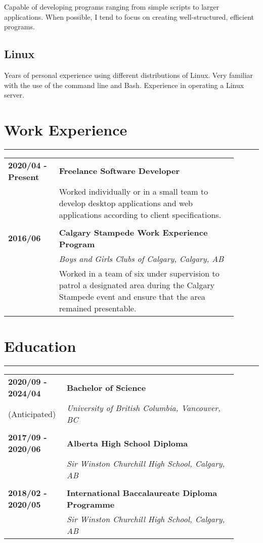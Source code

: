 \documentclass[letterpaper]{article}
\newcommand{\horizontalLine}{%
    \rule{\linewidth}{0.2pt}
    \vspace{1ex}
}
\begin{document}
        Capable of developing programs ranging from simple scripts to larger applications.
        When possible, I tend to focus on creating well-structured, efficient programs.

        \subsection*{Linux}

        Years of personal experience using different distributions of Linux.
        Very familiar with the use of the command line and Bash.
        Experience in operating a Linux server.

    \section*{Work Experience}

        \horizontalLine

        \begin{tabular}{p{0.2\linewidth} p{0.7\linewidth}} 
            \textbf{2020/04 - Present} & \large\textbf{Freelance Software Developer} \\
            & Worked individually or in a small team to develop desktop applications and web applications according to client specifications. \\
            \\
            \textbf{2016/06} & \large\textbf{Calgary Stampede Work Experience Program} \\
            & \emph{Boys and Girls Clubs of Calgary, Calgary, AB} \\
            & Worked in a team of six under supervision to patrol a designated area during the Calgary Stampede event and ensure that the area remained presentable. \\
        \end{tabular}

    \section*{Education}

        \horizontalLine

        \begin{tabular}{p{0.2\linewidth} p{0.7\linewidth}} 
            \textbf{2020/09 - 2024/04} & \large\textbf{Bachelor of Science} \\
            (Anticipated) & \emph{University of British Columbia, Vancouver, BC} \\
            \\
            \textbf{2017/09 - 2020/06} & \large\textbf{Alberta High School Diploma} \\
            & \emph{Sir Winston Churchill High School, Calgary, AB} \\
            \\
            \textbf{2018/02 - 2020/05} & \large\textbf{International Baccalaureate Diploma Programme} \\
            & \emph{Sir Winston Churchill High School, Calgary, AB} \\
        \end{tabular}
\end{document}
